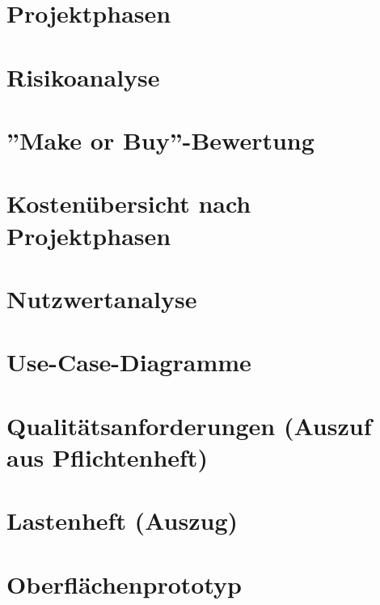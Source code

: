 \begin{appendices}

	
	\section{Projektphasen}		
		
		\newpage

	\section{Risikoanalyse}		
		
		\newpage		
		
	\section{''Make or Buy''-Bewertung}		
		
		\newpage
	
	\section{Kostenübersicht nach Projektphasen}		
		
		\newpage

	\section{Nutzwertanalyse}		
		
		\newpage
		
	\section{Use-Case-Diagramme}		
		
		\newpage		
		
	\section{Qualitätsanforderungen (Auszuf aus Pflichtenheft)}		
		
		\newpage
		
	\section{Lastenheft (Auszug)}
		
		\newpage
		
	\section{Oberflächenprototyp}
		
		\newpage
		

\end{appendices}
